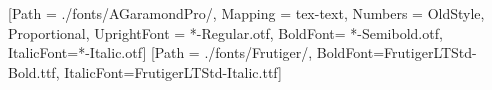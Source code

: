 \newcommand\nobrkhyph{\mbox{-}}

\newcommand{\I}{\textrm{\scshape i}\xspace}
\newcommand{\II}{\textrm{\scshape ii}\xspace}
\newcommand{\III}{\textrm{\scshape iii}\xspace}
\newcommand{\IV}{\textrm{\scshape iv}\xspace}
\newcommand{\V}{\textrm{\scshape v}\xspace}
\newcommand{\VI}{\textrm{\scshape vi}\xspace}
\newcommand{\VII}{\textrm{\scshape vii}\xspace}
\newcommand{\VIII}{\textrm{\scshape viii}\xspace}
\newcommand{\IX}{\textrm{\scshape ix}\xspace}
\newcommand{\X}{\textrm{\scshape x}\xspace}
\newcommand{\ISBN}{\textrm{\scshape isbn}\xspace}
\newcommand{\ISSN}{\textrm{\scshape issn}\xspace}

\usepackage{tocloft}
\setlength{\cftbeforepartskip}{5.0mm}
\setlength{\cftbeforechapskip}{2.0mm}
\setlength{\cftbeforesecskip}{0.0mm}

\usepackage{pageslts}

\usepackage{ifxetex}

\ifxetex
	\usepackage{mathspec}
	\usepackage[no-math]{fontspec}
	\usepackage{xunicode}
	\usepackage{xltxtra}
    \usepackage[Adobe Garamond]{mathdesign}
	\setmainfont{AGaramondPro}[Path = ./fonts/AGaramondPro/, Mapping = tex-text, Numbers = {OldStyle, Proportional}, UprightFont = *-Regular.otf, BoldFont= *-Semibold.otf, ItalicFont=*-Italic.otf]
	\setsansfont{FrutigerLTStd-Roman.ttf}[Path = ./fonts/Frutiger/, BoldFont=FrutigerLTStd-Bold.ttf, ItalicFont=FrutigerLTStd-Italic.ttf]
	
